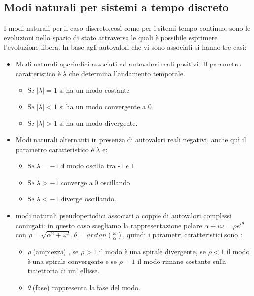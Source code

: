 \documentclass{article}
\begin{document}
\subsection{Modi naturali per sistemi a tempo discreto}
I modi naturali per il caso discreto,così come per i sitemi tempo continuo, sono le evoluzioni nello spazio di stato attraverso le quali è possibile esprimere l'evoluzione libera. In base agli autovalori che vi sono associati si hanno tre casi:\\
\begin{itemize}
    \item Modi naturali aperiodici associati ad autovalori reali positivi.
    Il parametro caratteristico è $\lambda$ che determina l'andamento temporale.
    \begin{itemize}
        \item Se $|\lambda|=1$ si ha un modo costante
        \item Se $|\lambda|<1$ si ha un modo convergente a 0
        \item Se $|\lambda|>1$ si ha un modo divergente.
    \end{itemize}
    \item Modi naturali alternanti in presenza di autovalori reali negativi,
    anche quì il parametro caratteristico è $\lambda$ e:
    \begin{itemize}
        \item Se $\lambda=-1$ il modo oscilla tra -1 e 1
        \item Se $\lambda>-1$ converge a 0 oscillando
        \item Se $\lambda<-1$ diverge oscillando.
    \end{itemize}
    \item modi naturali pseudoperiodici associati a coppie di autovalori complessi coniugati: in questo caso
    scegliamo la rappresentazione polare $\alpha + i \omega = \rho e^{i\theta}$ con
    $\rho = \sqrt{\alpha^2+\omega^2}, \theta = arctan\left(\frac{\omega}{\alpha}\right)$, quindi
    i parametri caratteristici sono : 
    \begin{itemize}
        \item $\rho$ (ampiezza) , se $\rho>1$ il modo è una spirale divergente,
        se $\rho<1$ il modo è una spirale convergente e se $\rho=1$
        il modo rimane costante sulla traiettoria di un' ellisse.
        \item $\theta$ (fase) rappresenta la fase del modo.
    \end{itemize}
\end{itemize}
\end{document}
